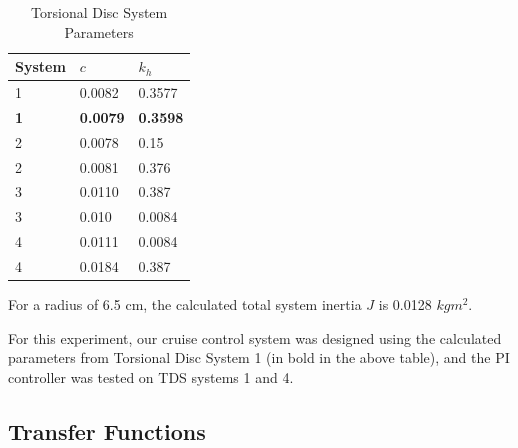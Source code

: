 \documentclass[11pt,titlepage]{article}
\begin{document}
    
            \begin{table}[h!]
            \centering
            \begin{tabular}{|m{4cm}|m{3cm}|m{3cm}|} 
                \hline
                System & $c$ &$k_h$ \\ 
                \hline
                1 &  0.0082 & 0.3577\\
                \hline
                \textbf{1} & \textbf{0.0079} & \textbf{0.3598}\\
                \hline
                2 & 0.0078 & 0.15\\
                \hline
                2 & 0.0081 & 0.376\\
                \hline
                3 & 0.0110 & 0.387\\
                \hline
                3 & 0.010 & 0.0084\\
                \hline
                4 & 0.0111 & 0.0084\\
                \hline
                4 & 0.0184 & 0.387\\
                \hline
            \end{tabular}
            \caption{Torsional Disc System Parameters} \label{table:TDS_param}
        \end{table}
        
        For a radius of 6.5 cm, the calculated total system inertia $J$ is 0.0128 $kg m^2$.
        
        For this experiment, our cruise control system was designed using the calculated parameters from Torsional Disc System 1 (in bold in the above table), and the PI controller was tested on TDS systems 1 and 4.

    \subsection{Transfer Functions}
    
\end{document}
